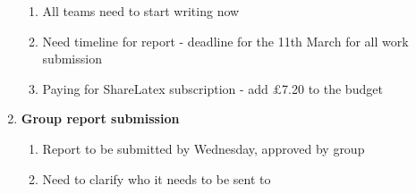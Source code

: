 \begin{enumerate}
\begin{enumerate}
\item  All teams need to start writing now

\item  Need timeline for report - deadline for the 11th March for all work submission

\item  Paying for ShareLatex subscription - add $\mathsterling$7.20 to the budget
\end{enumerate}

\item  \textbf{Group report submission}

\begin{enumerate}
\item Report to be submitted by Wednesday, approved by group

\item  Need to clarify who it needs to be sent to
\end{enumerate}
\end{enumerate}

